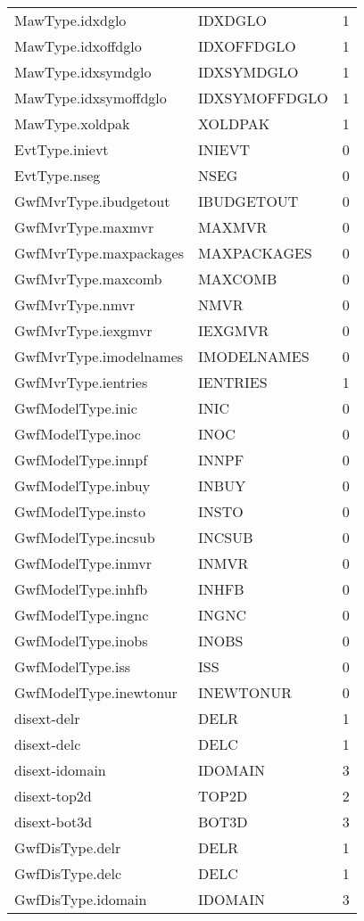 \begin{longtable}{p{6cm} p{4cm} p{2cm} }
MawType.idxdglo &  IDXDGLO & 1 \\ 
MawType.idxoffdglo &  IDXOFFDGLO & 1 \\ 
MawType.idxsymdglo &  IDXSYMDGLO & 1 \\ 
MawType.idxsymoffdglo &  IDXSYMOFFDGLO & 1 \\ 
MawType.xoldpak &  XOLDPAK & 1 \\ 
EvtType.inievt &  INIEVT & 0 \\ 
EvtType.nseg &  NSEG & 0 \\ 
GwfMvrType.ibudgetout &  IBUDGETOUT & 0 \\ 
GwfMvrType.maxmvr &  MAXMVR & 0 \\ 
GwfMvrType.maxpackages &  MAXPACKAGES & 0 \\ 
GwfMvrType.maxcomb &  MAXCOMB & 0 \\ 
GwfMvrType.nmvr &  NMVR & 0 \\ 
GwfMvrType.iexgmvr &  IEXGMVR & 0 \\ 
GwfMvrType.imodelnames &  IMODELNAMES & 0 \\ 
GwfMvrType.ientries &  IENTRIES & 1 \\ 
GwfModelType.inic &   INIC & 0 \\ 
GwfModelType.inoc &   INOC & 0 \\ 
GwfModelType.innpf &  INNPF & 0 \\ 
GwfModelType.inbuy &  INBUY & 0 \\ 
GwfModelType.insto &  INSTO & 0 \\ 
GwfModelType.incsub &  INCSUB & 0 \\ 
GwfModelType.inmvr &  INMVR & 0 \\ 
GwfModelType.inhfb &  INHFB & 0 \\ 
GwfModelType.ingnc &  INGNC & 0 \\ 
GwfModelType.inobs &  INOBS & 0 \\ 
GwfModelType.iss &    ISS & 0 \\ 
GwfModelType.inewtonur &  INEWTONUR & 0 \\ 
disext-delr &  DELR & 1 \\ 
disext-delc &  DELC & 1 \\ 
disext-idomain & IDOMAIN & 3 \\ 
disext-top2d &  TOP2D & 2 \\ 
disext-bot3d & BOT3D & 3 \\ 
GwfDisType.delr &  DELR & 1 \\ 
GwfDisType.delc &  DELC & 1 \\ 
GwfDisType.idomain &  IDOMAIN & 3 \\ 

\end{longtable}
